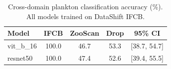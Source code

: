 \begin{table}[t]
\centering
\caption{Cross-domain plankton classification accuracy (\%). All models trained on DataShift IFCB.}
\label{tab:cross_domain}
\begin{tabular}{lcccc}
\toprule
\textbf{Model} & \textbf{IFCB} & \textbf{ZooScan} & \textbf{Drop} & \textbf{95\% CI} \\
\midrule
vit_b_16 & 100.0 & 46.7 & 53.3 & [38.7, 54.7] \\
resnet50 & 100.0 & 47.4 & 52.6 & [39.4, 55.5] \\
\bottomrule
\end{tabular}
\end{table}
